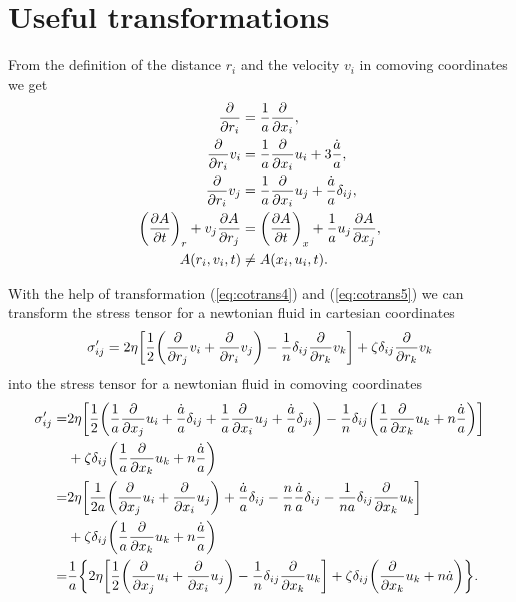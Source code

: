\section{Useful transformations}
From the definition of the distance $r_i$ and the velocity $v_i$ in comoving
coordinates we get 
\begin{align}
\pd{r_i}&=\fa\pd{x_i},\\
\pd{r_i}v_i&=\fa\pd{x_i}u_i+3\fh,\label{eq:cotrans4}\\
\pd{r_i}v_j&=\fa\pd{x_i}u_j + \fh\delta_{ij}, \label{eq:cotrans5}\\
\lra{\frac{\partial A}{\partial t}}_r+v_j \frac{\partial A}{\partial r_j} &= 
\lra{\frac{\partial A}{\partial t}}_x+\fa u_j \frac{\partial A}{\partial
x_j},\\
A(r_i,v_i,t) &\neq A(x_i,u_i,t).
\end{align}

With the help of transformation (\ref{eq:cotrans4}) and (\ref{eq:cotrans5}) we
can transform the stress tensor for a newtonian fluid in cartesian coordinates
\begin{align}
\sigma'_{ij}= 2\eta\lrb{\frac{1}{2}\lra{\pd{r_j}v_i+\pd{r_i}v_j}
-\frac{1}{n}\delta_{ij}\pd{r_k}v_k}+\zeta\delta_{ij}\pd{r_k}v_k
\end{align}
into the stress tensor for a newtonian fluid in comoving coordinates
\begin{align}
\sigma'_{ij}=& 
2\eta\lrb{\frac{1}{2} 
\lra{\fa\pd{x_j}u_i+\fh\delta_{ij}+\fa\pd{x_i}u_j+\fh\delta_{ji}} 
-\frac{1}{n}\delta_{ij}\lra{\fa\pd{x_k}u_k+n\fh}}\\
&+\zeta\delta_{ij}\lra{\fa\pd{x_k}u_k+n\fh}\\
=&2\eta\lrb{\frac{1}{2 a} 
\lra{\pd{x_j}u_i+\pd{x_i}u_j}+\fh\delta_{ij}-\frac{n}{n}\fh\delta_{ij}
-\frac{1}{n a}\delta_{ij}\pd{x_k}u_k}\\
&+\zeta\delta_{ij}\lra{\fa\pd{x_k}u_k+n\fh}\\
=&\fa\lrc{2\eta\lrb{\frac{1}{2} 
\lra{\pd{x_j}u_i+\pd{x_i}u_j}-\frac{1}{n}\delta_{ij}\pd{x_k}u_k}
+\zeta\delta_{ij}\lra{\pd{x_k}u_k+n\dot{a}}}.
\end{align}

